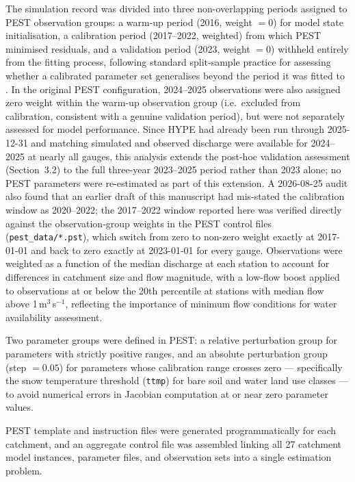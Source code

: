 \documentclass[draft]{agujournal2019}
\begin{document}
The simulation record was divided into three non-overlapping periods assigned to PEST observation groups: a warm-up period (2016, weight $= 0$) for model state initialisation, a calibration period (2017--2022, weighted) from which PEST minimised residuals, and a validation period (2023, weight $= 0$) withheld entirely from the fitting process, following standard split-sample practice for assessing whether a calibrated parameter set generalises beyond the period it was fitted to \cite{Arsenault2018}. In the original PEST configuration, 2024--2025 observations were also assigned zero weight within the warm-up observation group (i.e.\ excluded from calibration, consistent with a genuine validation period), but were not separately assessed for model performance. Since HYPE had already been run through 2025-12-31 and matching simulated and observed discharge were available for 2024--2025 at nearly all gauges, this analysis extends the post-hoc validation assessment (Section~3.2) to the full three-year 2023--2025 period rather than 2023 alone; no PEST parameters were re-estimated as part of this extension. A 2026-08-25 audit also found that an earlier draft of this manuscript had mis-stated the calibration window as 2020--2022; the 2017--2022 window reported here was verified directly against the observation-group weights in the PEST control files (\texttt{pest\_data/*.pst}), which switch from zero to non-zero weight exactly at 2017-01-01 and back to zero exactly at 2023-01-01 for every gauge. Observations were weighted as a function of the median discharge at each station to account for differences in catchment size and flow magnitude, with a low-flow boost applied to observations at or below the 20th percentile at stations with median flow above 1\,m$^3$\,s$^{-1}$, reflecting the importance of minimum flow conditions for water availability assessment.

Two parameter groups were defined in PEST: a relative perturbation group for parameters with strictly positive ranges, and an absolute perturbation group (step $= 0.05$) for parameters whose calibration range crosses zero — specifically the snow temperature threshold (\texttt{ttmp}) for bare soil and water land use classes — to avoid numerical errors in Jacobian computation at or near zero parameter values.

PEST template and instruction files were generated programmatically for each catchment, and an aggregate control file was assembled linking all 27 catchment model instances, parameter files, and observation sets into a single estimation problem.
\end{document}
